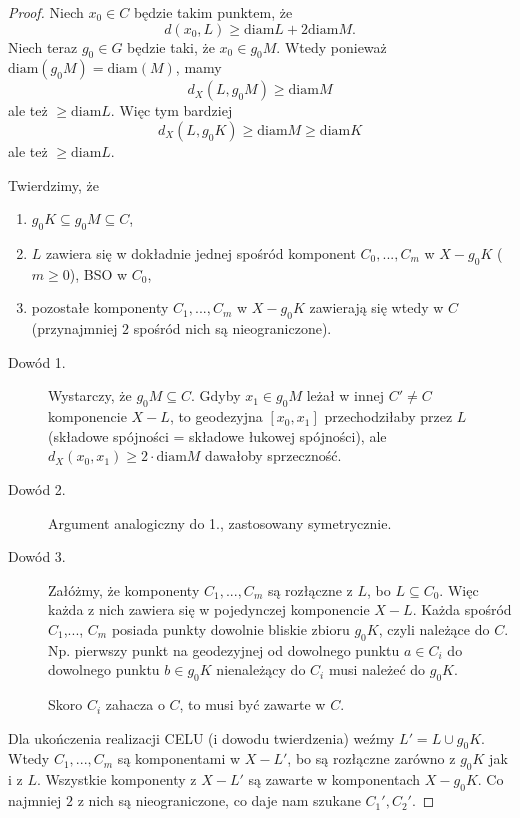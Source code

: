 \begin{proof}

  Niech $x_0\in C$ będzie takim punktem, że 
  $$d(x_0,L)\geq \text{diam}L+2\text{diam}M.$$ 
  Niech teraz $g_0\in G$ będzie taki, że $x_0\in g_0M$. Wtedy ponieważ $\text{diam}(g_0M)=\text{diam}(M)$, mamy 
  $$d_X(L, g_0M)\geq \text{diam}M$$ 
  ale też $\geq\text{diam}L$. Więc tym bardziej 
  $$d_X(L, g_0K)\geq \text{diam}M\geq \text{diam}K$$ 
  ale też $\geq\text{diam}L$.

  Twierdzimy, że 
  \begin{enumerate}
    \item $g_0K\subseteq g_0M\subseteq C$,
    \item $L$ zawiera się w dokładnie jednej spośród komponent $C_0,...,C_m$ w $X-g_0K$ ($m\geq0$), BSO w $C_0$,
    \item pozostałe komponenty $C_1,..., C_m$ w $X-g_0K$ zawierają się wtedy w $C$ (przynajmniej $2$ spośród nich są nieograniczone).
  \end{enumerate}

  \begin{description}
    \item[Dowód 1.] Wystarczy, że $g_0M\subseteq C$. Gdyby $x_1\in g_0M$ leżał w innej $C'\neq C$ komponencie $X-L$, to geodezyjna $[x_0, x_1]$ przechodziłaby przez $L$ (składowe spójności = składowe łukowej spójności), ale $d_X(x_0, x_1)\geq 2\cdot \text{diam}M$ dawałoby sprzeczność.
    \item[Dowód 2.] Argument analogiczny do 1., zastosowany symetrycznie.
    \item[Dowód 3.] Załóżmy, że komponenty $C_1,...,C_m$ są rozłączne z $L$, bo $L\subseteq C_0$. Więc każda z nich zawiera się w pojedynczej komponencie $X-L$. Każda spośród $C_1$,..., $C_m$ posiada punkty dowolnie bliskie zbioru $g_0K$, czyli należące do $C$. Np. pierwszy punkt na geodezyjnej od dowolnego punktu $a\in C_i$ do dowolnego punktu $b\in g_0K$ nienależący do $C_i$  musi należeć do $g_0K$. 

  Skoro $C_i$ zahacza o $C$, to musi być zawarte w $C$.

  \end{description}


  Dla ukończenia realizacji CELU (i dowodu twierdzenia) weźmy $L'=L\cup g_0K$. Wtedy $C_1,..., C_m$ są komponentami w $X-L'$, bo są rozłączne zarówno z $g_0K$ jak i z $L$. Wszystkie komponenty z $X-L'$ są zawarte w komponentach $X-g_0K$. Co najmniej $2$ z nich są nieograniczone, co daje nam szukane $C_1', C_2'$. 
\end{proof}

